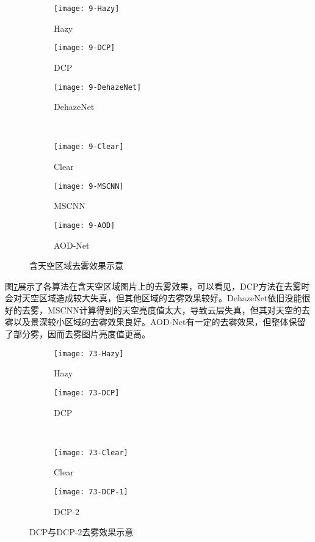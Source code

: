 \documentclass[a4paper, 12pt, oneside]{report}
\begin{document}
{\begin{figure}[htbp]
\begin{subfigure}{.33\textwidth}
  \centering
  \texttt{[image: 9-Hazy]}
  \caption{Hazy}
  \label{fig:sfig11}
\end{subfigure}%
\begin{subfigure}{.33\textwidth}
  \centering
  \texttt{[image: 9-DCP]}
  \caption{DCP}
  \label{fig:sfig22}
\end{subfigure}
\begin{subfigure}{.33\textwidth}
  \centering
  \texttt{[image: 9-DehazeNet]}
  \caption{DehazeNet}
  \label{fig:sfig33}
\end{subfigure} \\
\begin{subfigure}{.33\textwidth}
  \centering
  \texttt{[image: 9-Clear]}
  \caption{Clear}
  \label{fig:sfig44}
\end{subfigure}
\begin{subfigure}{.33\textwidth}
  \centering
  \texttt{[image: 9-MSCNN]}
  \caption{MSCNN}
  \label{fig:sfig55}
\end{subfigure}%
\begin{subfigure}{.33\textwidth}
  \centering
  \texttt{[image: 9-AOD]}
  \caption{AOD-Net}
  \label{fig:sfig66}
\end{subfigure}
\caption{含天空区域去雾效果示意}
\label{fig:4.2}
\end{figure}

图\ref{fig:4.2}展示了各算法在含天空区域图片上的去雾效果，可以看见，DCP方法在去雾时会对天空区域造成较大失真，但其他区域的去雾效果较好。DehazeNet依旧没能很好的去雾，MSCNN计算得到的天空亮度值太大，导致云层失真，但其对天空的去雾以及景深较小区域的去雾效果良好。AOD-Net有一定的去雾效果，但整体保留了部分雾，因而去雾图片亮度值更高。
\begin{figure}[htbp]
\begin{subfigure}{.5\textwidth}
  \centering
  \texttt{[image: 73-Hazy]}
  \caption{Hazy}
  \label{fig:sfig111}
\end{subfigure}%
\begin{subfigure}{.5\textwidth}
  \centering
  \texttt{[image: 73-DCP]}
  \caption{DCP}
  \label{fig:sfig222}
\end{subfigure} \\
\begin{subfigure}{.5\textwidth}
  \centering
  \texttt{[image: 73-Clear]}
  \caption{Clear}
  \label{fig:sfig333}
\end{subfigure} 
\begin{subfigure}{.5\textwidth}
  \centering
  \texttt{[image: 73-DCP-1]}
  \caption{DCP-2}
  \label{fig:sfig444}
\end{subfigure}
\caption{DCP与DCP-2去雾效果示意}
\label{fig:4.3}
\end{figure}

}
\end{document}
